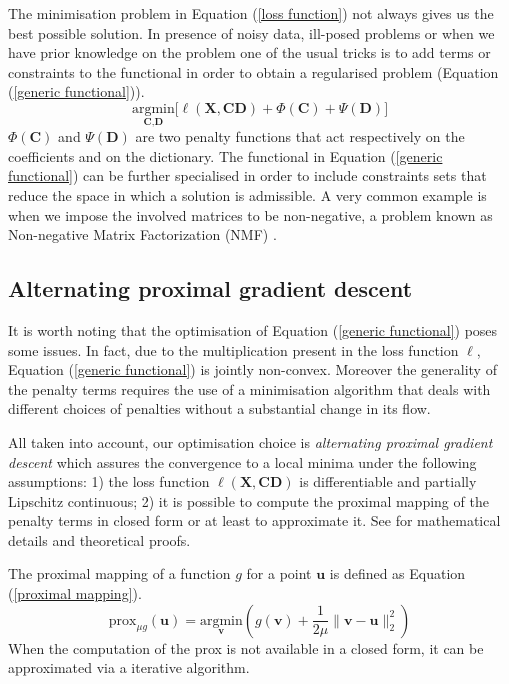 \documentclass[a4paper,UKenglish]{oasics-v2016}
\begin{document}
The minimisation problem in Equation (\ref{loss function}) not always gives us the best possible solution. In presence of noisy data, ill-posed problems or when we have prior knowledge on the problem one of the usual tricks is to add terms or constraints to the functional in order to obtain a regularised problem (Equation (\ref{generic functional})).
%
\begin{equation}\label{generic functional}
\underset{\textbf{C}, \textbf{D}}{\text{argmin}} \bigg[ \ell(\textbf{X}, \textbf{CD}) + \Phi(\textbf{C}) + \Psi(\textbf{D}) \bigg]
\end{equation}
$\Phi(\textbf{C})$  and $\Psi(\textbf{D})$ are two penalty functions that act respectively on the coefficients and on the dictionary.
The functional in Equation (\ref{generic functional}) can be further specialised in order to include constraints sets that reduce the space in which a solution is admissible. A very common example is when we impose the involved matrices to be non-negative, a problem known as Non-negative Matrix Factorization (NMF) \cite{lee1999learning}.
%
%
\subsection{Alternating proximal gradient descent}
It is worth noting that the optimisation of Equation (\ref{generic functional}) poses some issues. In fact, due to the multiplication present in the loss function $\ell$, Equation (\ref{generic functional}) is jointly non-convex. Moreover the generality of the penalty terms requires the use of a minimisation algorithm that deals with different choices of penalties without a substantial change in its flow.

All taken into account, our optimisation choice is \emph{alternating proximal gradient descent} \cite{bolte2014proximal} which assures the convergence to a local minima under the following assumptions: 1) the loss function $\ell(\textbf{X}, \textbf{C}\textbf{D})$  is differentiable and partially Lipschitz continuous; 2) it is possible to compute the proximal mapping of the penalty terms in closed form or at least to approximate it. See \cite{bolte2014proximal} for mathematical details and theoretical proofs.

The proximal mapping \cite{parikh2014proximal} of a function $g$ for a point $\textbf{u}$ is defined as Equation (\ref{proximal mapping}).
\begin{equation}\label{proximal mapping}
\text{prox}_{\mu g}(\textbf{u}) = \underset{\textbf{v}}{\text{argmin}}\left(g(\textbf{v}) + \frac{1}{2\mu}\parallel\textbf{v} - \textbf{u}\parallel_2^2\right)
\end{equation}
When the computation of the prox is not available in a closed form, it can be approximated via a iterative algorithm.
\end{document}
